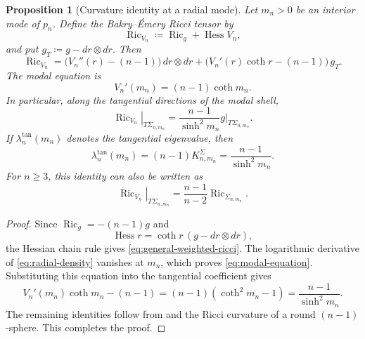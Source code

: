 \documentclass{amsart}
\numberwithin{equation}{section}
\theoremstyle{plain}
\newtheorem{prop}[thm]{Proposition}
\theoremstyle{definition}
\theoremstyle{remark}
\DeclareMathOperator{\Ric}{Ric}
\DeclareMathOperator{\Hess}{Hess}
\begin{document}
\begin{prop}[Curvature identity at a radial mode]
\label{prop:modal-curvature}
	Let $m_n>0$ be an interior mode of $p_n$.  Define the Bakry--\'Emery
	Ricci tensor by
	\[
		\Ric_{V_n}\coloneqq\Ric_g+\Hess V_n,
	\]
	and put $g_T\coloneqq g-dr\otimes dr$.  Then
	\begin{equation}\label{eq:general-weighted-ricci}
		\Ric_{V_n}
		=
		\bigl(V_n''(r)-(n-1)\bigr)\,dr\otimes dr
		+
		\bigl(V_n'(r)\coth r-(n-1)\bigr)\,g_T.
	\end{equation}
	The modal equation is
\begin{equation}\label{eq:modal-equation} V_n'(m_n)=(n-1)\coth m_n. \end{equation}
	In particular, along the tangential directions of the modal shell,
	\begin{equation}\label{eq:modal-tangential-curvature}
		\left.\Ric_{V_n}\right|_{T\Sigma_{n,m_n}}
		=
		\frac{n-1}{\sinh^2m_n}
		\left.g\right|_{T\Sigma_{n,m_n}}.
	\end{equation}
	If $\lambda_n^{\mathrm{tan}}(m_n)$ denotes the tangential eigenvalue,
	then
	\begin{equation}\label{eq:curvature-matching}
		\lambda_n^{\mathrm{tan}}(m_n)
		=
		(n-1)K_{n,m_n}^{\Sigma}
		=
		\frac{n-1}{\sinh^2m_n}.
	\end{equation}
	For $n\ge3$, this identity can also be written as
\[ \left.\Ric_{V_n}\right|_{T\Sigma_{n,m_n}} = \frac{n-1}{n-2}\Ric_{\Sigma_{n,m_n}}. \]
\end{prop}

\begin{proof}
	Since $\Ric_g=-(n-1)g$ and
	\[
		\Hess r=\coth r\,(g-dr\otimes dr),
	\]
	the Hessian chain rule gives \eqref{eq:general-weighted-ricci}.  The
	logarithmic derivative of \eqref{eq:radial-density} vanishes at $m_n$,
	which proves \eqref{eq:modal-equation}.  Substituting this equation into
	the tangential coefficient gives
\[ V_n'(m_n)\coth m_n-(n-1) = (n-1)(\coth^2m_n-1) = \frac{n-1}{\sinh^2m_n}. \]
	The remaining identities follow from  and the
	Ricci curvature of a round $(n-1)$-sphere.  This completes the proof.
\end{proof}
\end{document}

